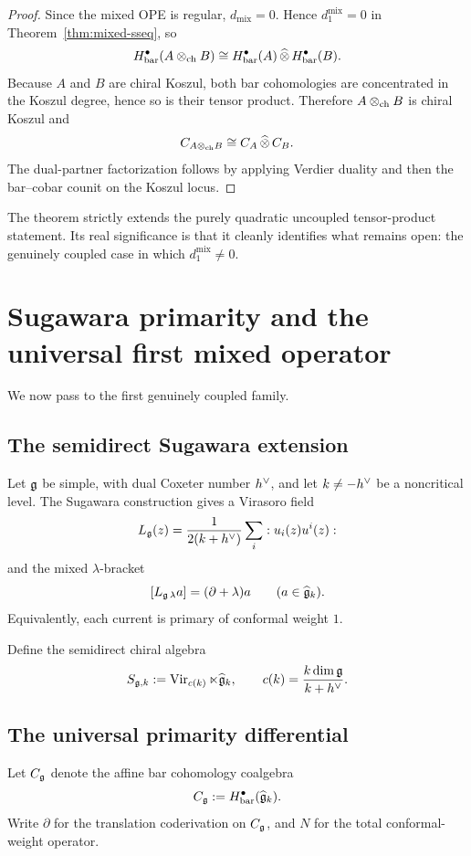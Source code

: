\begin{proof}
Since the mixed OPE is regular, \(d_{\mathrm{mix}}=0\). Hence \(d_1^{\mathrm{mix}}=0\) in Theorem~\ref{thm:mixed-sseq}, so
\[
H^\bullet_{\mathrm{bar}}(A\otimes_{\mathrm{ch}} B)\cong H^\bullet_{\mathrm{bar}}(A)\,\widehat\otimes\, H^\bullet_{\mathrm{bar}}(B).
\]
Because \(A\) and \(B\) are chiral Koszul, both bar cohomologies are concentrated in the Koszul degree, hence so is their tensor product. Therefore \(A\otimes_{\mathrm{ch}} B\) is chiral Koszul and
\[
C_{A\otimes_{\mathrm{ch}} B}\cong C_A\,\widehat\otimes\, C_B.
\]
The dual-partner factorization follows by applying Verdier duality and then the bar--cobar counit on the Koszul locus.
\end{proof}

\begin{remark}
The theorem strictly extends the purely quadratic uncoupled tensor-product statement. Its real significance is that it cleanly identifies what remains open: the genuinely coupled case in which \(d_1^{\mathrm{mix}}\neq 0\).
\end{remark}

\section{Sugawara primarity and the universal first mixed operator}

We now pass to the first genuinely coupled family.

\subsection{The semidirect Sugawara extension}

Let \(\mathfrak g\) be simple, with dual Coxeter number \(h^\vee\), and let \(k\neq -h^\vee\) be a noncritical level. The Sugawara construction gives a Virasoro field
\[
L_{\mathfrak g}(z)=\frac{1}{2(k+h^\vee)}\sum_i :u_i(z)u^i(z):
\]
and the mixed \(\lambda\)-bracket
\[
[L_{\mathfrak g\,\lambda}a]=(\partial+\lambda)a
\qquad(a\in \widehat{\mathfrak g}_k).
\]
Equivalently, each current is primary of conformal weight \(1\).

Define the semidirect chiral algebra
\[
S_{\mathfrak g,k}:=\operatorname{Vir}_{c(k)}\ltimes \widehat{\mathfrak g}_k,
\qquad
c(k)=\frac{k\dim\mathfrak g}{k+h^\vee}.
\]

\subsection{The universal primarity differential}

Let \(C_{\mathfrak g}\) denote the affine bar cohomology coalgebra
\[
C_{\mathfrak g}:=H^\bullet_{\mathrm{bar}}(\widehat{\mathfrak g}_k).
\]
Write \(\partial\) for the translation coderivation on \(C_{\mathfrak g}\), and \(N\) for the total conformal-weight operator.

